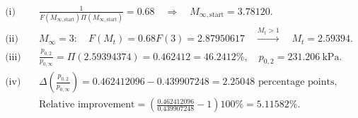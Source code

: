 \begin{align*}
\text{(i)}\quad&
\frac{1}{F(M_{\infty,\mathrm{start}})\Pi(M_{\infty,\mathrm{start}})}=0.68
\quad\Longrightarrow\quad
\boxed{M_{\infty,\mathrm{start}}=3.78120}.\\[5pt]
\text{(ii)}\quad&
M_\infty=3:\quad F(M_t)=0.68F(3)=2.87950617
\quad\xrightarrow{M_t>1}\quad\boxed{M_t=2.59394}.\\[5pt]
\text{(iii)}\quad&
\frac{p_{0,2}}{p_{0,\infty}}=\Pi(2.59394374)
=\boxed{0.462412=46.2412\%},\quad
p_{0,2}=231.206~\mathrm{kPa}.\\[5pt]
\text{(iv)}\quad&
\Delta\!\left(\frac{p_{0,2}}{p_{0,\infty}}\right)
=0.462412096-0.439907248
=\boxed{2.25048\text{ percentage points}},\\
&\text{Relative improvement}
=\left(\frac{0.462412096}{0.439907248}-1\right)100\%
=\boxed{5.11582\%}.
\end{align*}

